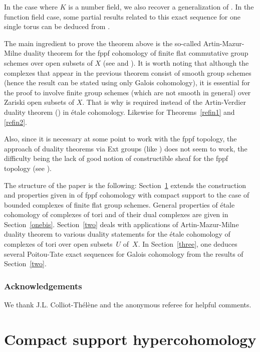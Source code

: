 In the case where $K$ is a number field, we also recover a generalization of \cite[Th.\,6.1 \& 6.3]{demphd}. In the function field case, some partial results related to this exact sequence for one single torus can be deduced from \cite[\S6]{gonz1}.

The main ingredient to prove the theorem above is the so-called Artin-Mazur-Milne duality theorem for the fppf cohomology of finite flat commutative group schemes over open subsets of $X$ (see \cite[Th.\,III.8.2]{MilADT} and \cite[Th.\,1.1]{DemH}).
It is worth noting that although the complexes that appear in the previous
theorem consist of smooth group schemes (hence the result can be stated
using only Galois cohomology), it is essential for the proof to involve
finite group schemes (which are not
smooth in general) over Zariski open subsets of $X$. That is why
\cite[Th.\,1.1]{DemH} is required instead of the Artin-Verdier
duality theorem (\cite[Cor.\,II.3.3]{MilADT}) in étale cohomology.
Likewise for Theorems~\ref{refin1} and \ref{refin2}.\enlargethispage{-\baselineskip}%

Also, since it is necessary at some point to work with the fppf topology,
the approach of duality theorems via Ext groups (like \cite[Th.\,II.3.1]{MilADT}) does not seem to work, the difficulty being the lack of good
notion of constructible sheaf for the fppf topology (see \cite[Introduction to Chap.\,III]{MilADT}).

The structure of the paper is the following: Section~\ref{one} extends the construction and properties given in \cite{DemH} of fppf cohomology with compact support to the case of bounded complexes of finite flat group schemes. General properties of étale cohomology of complexes of tori and of their dual complexes are given in Section~\ref{onebis}. Section~\ref{two} deals with applications of Artin-Mazur-Milne duality theorem to various duality statements for the étale cohomology of complexes of tori over open subsets~$U$ of~$X$. In Section~\ref{three}, one deduces several Poitou-Tate exact sequences for Galois cohomology from the results of Section~\ref{two}.

\subsubsection*{Acknowledgements}
We thank J.L. Colliot-Thélène and the anonymous referee
for helpful comments.

\section{Compact support hypercohomology} \label{one}

